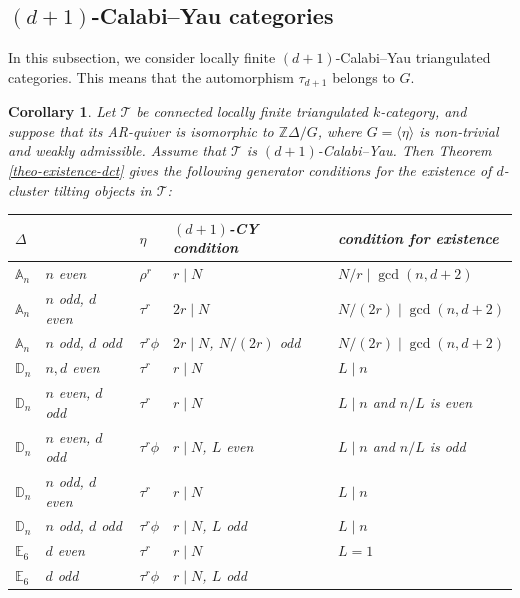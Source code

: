 \documentclass[12pt]{article}
\theoremstyle{plain}
\newtheorem{Coro}[Def]{Corollary}
\theoremstyle{definition}
\newcommand{\T}{\mathcal{T}}
\begin{document}
\subsection{$(d+1)$-Calabi--Yau categories}

In this subsection, we consider locally finite $(d+1)$-Calabi--Yau triangulated categories. This means that the automorphism $\tau_{d+1}$ belongs to $G$. 

\begin{Coro}\label{coro-CY-generator-conditions}
Let \(\T\) be connected locally finite triangulated $k$-category, and suppose that its AR-quiver is
isomorphic to \(\mathbb Z\Delta/G\), where \(G=\langle\eta\rangle\) is non-trivial and weakly
admissible. Assume that \(\T\) is \((d+1)\)-Calabi--Yau. Then Theorem
\ref{theo-existence-dct} gives the following generator conditions for the existence of $d$-cluster tilting objects in \(\T\):
\begin{center}
\renewcommand{\arraystretch}{1.25}
\begin{tabular}{p{}|p{}|p{}|p{}|p{}}
\toprule
\(\Delta\) & & \(\eta\) &
\((d+1)\)-CY condition & condition for existence\\
\hline
\(\mathbb A_n\)
& \(n\) even
& \(\rho^r\)
& \(r\mid N\)
& \(N/r\mid\gcd(n,d+2)\)\\
\hline
\(\mathbb A_n\)
& \(n\) odd, \(d\) even
& \(\tau^r\)
& \(2r\mid N\)
& \(N/(2r)\mid\gcd(n,d+2)\)\\
\hline
\(\mathbb A_n\)
& \(n\) odd, \(d\) odd
& \(\tau^r\phi\)
& \(2r\mid N\), \(N/(2r)\) odd
& \(N/(2r)\mid\gcd(n,d+2)\)\\
\hline
\(\mathbb D_n\)
& \(n,d\) even
& \(\tau^r\)
& \(r\mid N\)
& \(L\mid n\)\\
\hline
\(\mathbb D_n\)
& \(n\) even, \(d\) odd
& \(\tau^r\)
& \(r\mid N\)
& \(L\mid n\) and \(n/L\) is even\\
\hline
\(\mathbb D_n\)
& \(n\) even, \(d\) odd
& \(\tau^r\phi\)
& \(r\mid N\), \(L\) even
& \(L\mid n\) and \(n/L\) is odd\\
\hline
\(\mathbb D_n\)
& \(n\) odd, \(d\) even
& \(\tau^r\)
& \(r\mid N\)
& \(L\mid n\)\\
\hline
\(\mathbb D_n\)
& \(n\) odd, \(d\) odd
& \(\tau^r\phi\)
& \(r\mid N\), \(L\) odd
& \(L\mid n\)\\
\hline
\(\mathbb E_6\)
& \(d\) even
& \(\tau^r\)
& \(r\mid N\)
& \(L=1\)\\
\hline
\(\mathbb E_6\)
& \(d\) odd
& \(\tau^r\phi\)
& \(r\mid N\), \(L\) odd

\end{tabular}
\end{center}
\end{Coro}
\end{document}

